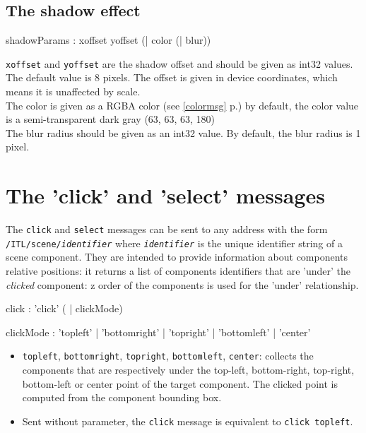 \documentclass[a4paper,twoside]{report}
\newcommand{\sublevel}[1]	{\section{#1}}
\newcommand{\subsublevel}[1]	{\subsection{#1}}
\newcommand{\fullref}[1]	{\ref{#1} p.\pageref{#1}}
\newcommand{\OSC}[1]		{\texttt{#1}}
\begin{document}
\subsublevel{The shadow effect}

\begin{rail}
shadowParams : xoffset yoffset (| color (| blur))
\end{rail}

\OSC{xoffset} and \OSC{yoffset} are the shadow offset and should be given as int32 values. The default value is 8 pixels. The offset is given in device coordinates, which means it is unaffected by scale. \\
The color is given as a RGBA color (see \fullref{colormsg}) by default, the color value is a semi-transparent dark gray (63, 63, 63, 180) \\
The blur radius should be given as an int32 value. By default, the blur radius is 1 pixel.

\sublevel{The 'click' and 'select' messages}
\label{csmsg}

The \OSC{click} and \OSC{select} messages can be sent to any address with the form \OSC{/ITL/scene/\textit{identifier}} where \OSC{\textit{identifier}} is the unique identifier string of a scene component. They are intended to provide information about components relative positions: it returns a list of components identifiers that are 'under' the \emph{clicked} component: z order of the components is used for the 'under' relationship. 
 
\begin{rail}
click :		'click' ( | clickMode)
\end{rail}
 
\begin{rail}
clickMode :	'topleft' | 'bottomright' | 'topright' | 'bottomleft' | 'center'
\end{rail}

 
\begin{itemize}
\item \OSC{topleft}, \OSC{bottomright}, \OSC{topright}, \OSC{bottomleft}, \OSC{center}: collects the components that are respectively under the top-left, bottom-right, top-right, bottom-left or center point of the target component. The clicked point is computed from the component bounding box.
\item Sent without parameter, the \OSC{click} message is equivalent to \OSC{click topleft}.
\end{itemize}
\end{document}
